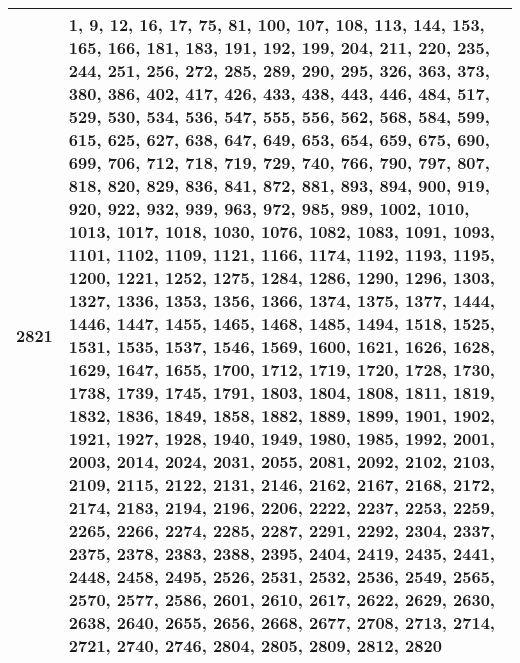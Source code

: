 \documentclass[12pt]{article}
\begin{document}
\begin{tabular}{|c|p{15cm}|}
    2821 & \scriptsize{1, 9, 12, 16, 17, 75, 81, 100, 107, 108, 113, 144, 153, 165, 166, 181, 183, 191, 192, 199, 204, 211, 220, 235, 244, 251, 256, 272, 285, 289, 290, 295, 326, 363, 373, 380, 386, 402, 417, 426, 433, 438, 443, 446, 484, 517, 529, 530, 534, 536, 547, 555, 556, 562, 568, 584, 599, 615, 625, 627, 638, 647, 649, 653, 654, 659, 675, 690, 699, 706, 712, 718, 719, 729, 740, 766, 790, 797, 807, 818, 820, 829, 836, 841, 872, 881, 893, 894, 900, 919, 920, 922, 932, 939, 963, 972, 985, 989, 1002, 1010, 1013, 1017, 1018, 1030, 1076, 1082, 1083, 1091, 1093, 1101, 1102, 1109, 1121, 1166, 1174, 1192, 1193, 1195, 1200, 1221, 1252, 1275, 1284, 1286, 1290, 1296, 1303, 1327, 1336, 1353, 1356, 1366, 1374, 1375, 1377, 1444, 1446, 1447, 1455, 1465, 1468, 1485, 1494, 1518, 1525, 1531, 1535, 1537, 1546, 1569, 1600, 1621, 1626, 1628, 1629, 1647, 1655, 1700, 1712, 1719, 1720, 1728, 1730, 1738, 1739, 1745, 1791, 1803, 1804, 1808, 1811, 1819, 1832, 1836, 1849, 1858, 1882, 1889, 1899, 1901, 1902, 1921, 1927, 1928, 1940, 1949, 1980, 1985, 1992, 2001, 2003, 2014, 2024, 2031, 2055, 2081, 2092, 2102, 2103, 2109, 2115, 2122, 2131, 2146, 2162, 2167, 2168, 2172, 2174, 2183, 2194, 2196, 2206, 2222, 2237, 2253, 2259, 2265, 2266, 2274, 2285, 2287, 2291, 2292, 2304, 2337, 2375, 2378, 2383, 2388, 2395, 2404, 2419, 2435, 2441, 2448, 2458, 2495, 2526, 2531, 2532, 2536, 2549, 2565, 2570, 2577, 2586, 2601, 2610, 2617, 2622, 2629, 2630, 2638, 2640, 2655, 2656, 2668, 2677, 2708, 2713, 2714, 2721, 2740, 2746, 2804, 2805, 2809, 2812, 2820} \\
    \hline

\end{tabular}
\end{document}
